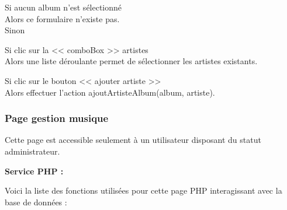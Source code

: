 \begin{paragraphe}
			\begin{paragraphe}
				Si aucun album n'est sélectionné \\
				Alors ce formulaire n'existe pas. \\
				Sinon
			\end{paragraphe}

			\begin{paragraphe}
				Si clic sur la << comboBox >> artistes \\
				Alors une liste déroulante permet de sélectionner les artistes existants.
			\end{paragraphe}

			\begin{paragraphe}
				Si clic sur le bouton << ajouter artiste >> \\
				Alors effectuer l'action ajoutArtisteAlbum(album, artiste).
			\end{paragraphe}

		\subsubsection{Page gestion musique}

			\begin{paragraphe}
				Cette page est accessible seulement à un utilisateur disposant du statut administrateur.
			\end{paragraphe}

			\begin{paragraphe}
				\textbf{Service PHP :}
			\end{paragraphe}

			\begin{paragraphe}
				Voici la liste des fonctions utilisées pour cette page PHP interagissant avec la base de données :
			\end{paragraphe}


\end{paragraphe}
